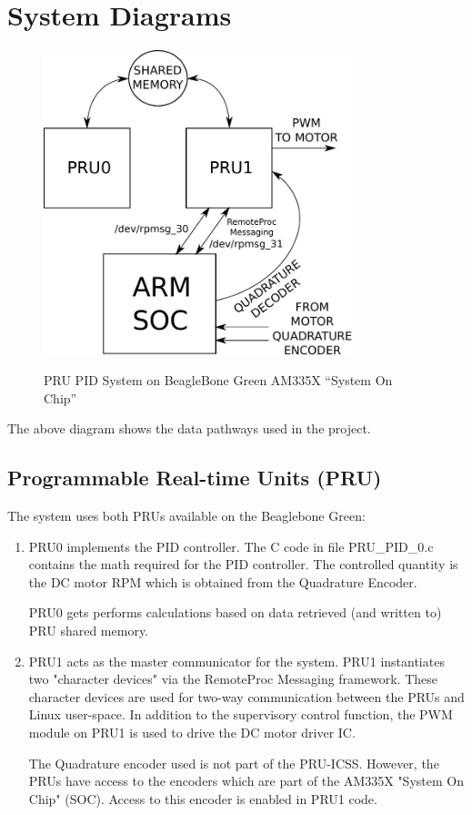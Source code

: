 \chapter{System Diagrams}

\begin{figure}[H]
	\centering
	\includegraphics[width=0.8\textwidth]{diagrams/soc_system}
	\centering\bfseries
	\caption{PRU PID System on BeagleBone Green AM335X ``System On Chip''}
\end{figure}

The above diagram shows the data pathways used in the project.

\section{Programmable Real-time Units (PRU)}

The system uses both PRUs available on the Beaglebone Green:

\begin{enumerate}
\item 

PRU0 implements the PID controller.  The C code in file PRU\_PID\_0.c contains
the math required for the PID controller.  The controlled quantity is the DC motor RPM which is obtained from the Quadrature Encoder.

PRU0 gets performs calculations based on data retrieved (and written to) PRU shared memory.
\item 
PRU1 acts as the master communicator for the system.  PRU1 instantiates two "character devices" via the RemoteProc Messaging framework.  These character devices are used for two-way communication between the PRUs and Linux user-space.  In addition to the supervisory control function, the PWM module on PRU1 is used to drive the DC motor driver IC.

The Quadrature encoder used is not part of the PRU-ICSS.  However, the PRUs have access to the encoders which are part of the AM335X "System On Chip" (SOC).  Access to this encoder is enabled in PRU1 code.
\end{enumerate}

